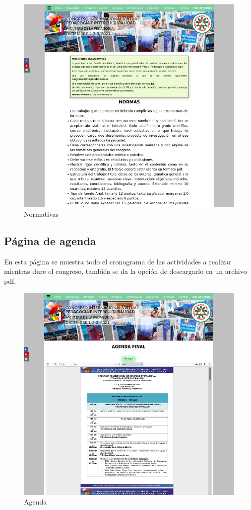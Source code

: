 \documentclass[a4paper,14px]{article}
\begin{document}
\begin{figure}[H]
  \centering
  \includegraphics[scale=0.6]{normativas.png}
  \caption{Normativas}
  \label{fig:arquitectura}
\end{figure}


\newpage
\subsection{Página de agenda }
\label{sec:pagina-principal}

En esta página se muestra todo el cronograma de las actividades a realizar mientras dure el congreso, también se da la opción de descargarlo en un archivo pdf.



\begin{figure}[H]
  \centering
  \includegraphics[scale=0.6]{agenda.png}
  \caption{Agenda}
  \label{fig:arquitectura}
\end{figure}
\end{document}
